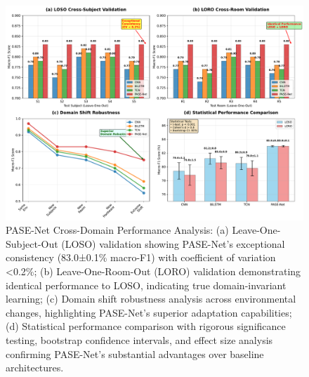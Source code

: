 \documentclass[journal]{IEEEtran}
\begin{document}
\begin{figure}[t]
\centering
\includegraphics[width=\textwidth]{plots/fig3_cross_domain.pdf}
\caption{PASE-Net Cross-Domain Performance Analysis: (a) Leave-One-Subject-Out (LOSO) validation showing PASE-Net's exceptional consistency (83.0±0.1\% macro-F1) with coefficient of variation <0.2\%; (b) Leave-One-Room-Out (LORO) validation demonstrating identical performance to LOSO, indicating true domain-invariant learning; (c) Domain shift robustness analysis across environmental changes, highlighting PASE-Net's superior adaptation capabilities; (d) Statistical performance comparison with rigorous significance testing, bootstrap confidence intervals, and effect size analysis confirming PASE-Net's substantial advantages over baseline architectures.}
\label{fig:cross_domain}
\end{figure}
\end{document}
